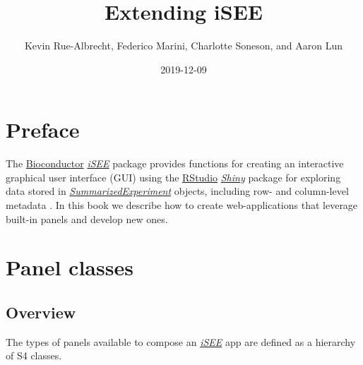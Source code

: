 \documentclass[]{book}
\title{Extending iSEE}
\author{Kevin Rue-Albrecht, Federico Marini, Charlotte Soneson, and Aaron Lun}
\date{2019-12-09}
\begin{document}
\maketitle

{
\setcounter{tocdepth}{1}
\tableofcontents
}
\hypertarget{preface}{%
\chapter*{Preface}\label{preface}}

The \href{https://bioconductor.org/}{Bioconductor} \emph{\href{https://bioconductor.org/packages/3.11/iSEE}{iSEE}} package provides functions for creating an interactive graphical user interface (GUI) using the \href{https://rstudio.com/}{RStudio} \emph{\href{https://CRAN.R-project.org/package=Shiny}{Shiny}} package for exploring data stored in \emph{\href{https://bioconductor.org/packages/3.11/SummarizedExperiment}{SummarizedExperiment}} objects, including row- and column-level metadata \citep{rue2018isee}.
In this book we describe how to create web-applications that leverage built-in panels and develop new ones.

\hypertarget{panel-classes}{%
\chapter{Panel classes}\label{panel-classes}}

\hypertarget{overview}{%
\section{Overview}\label{overview}}

The types of panels available to compose an \emph{\href{https://bioconductor.org/packages/3.11/iSEE}{iSEE}} app are defined as a hierarchy of S4 classes.
\end{document}
